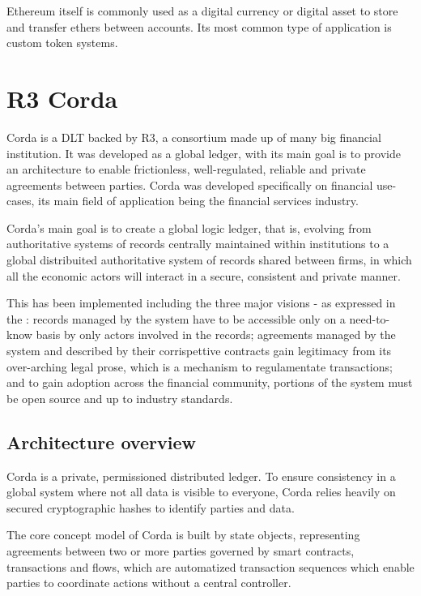 Ethereum itself is commonly used as a digital currency or digital asset to store and transfer ethers between accounts. Its most common type of application is custom token systems. 

\section{R3 Corda}

Corda is a DLT backed by R3, a consortium made up of many big financial institution. It was developed as a global ledger, with its main goal is to provide an architecture to enable frictionless, well-regulated, reliable and private agreements between parties. Corda was developed specifically on financial use-cases, its main field of application being the financial services industry.

Corda's main goal is to create a global logic ledger, that is, evolving from authoritative systems of records centrally maintained within institutions to a global distribuited authoritative system of records shared between firms, in which all the economic actors will interact in a secure, consistent and private manner.

This has been implemented including the three major visions - as expressed in the \cite{cordawhitepaper}: records managed by the system have to be accessible only on a need-to-know basis by only actors involved in the records; agreements managed by the system and described by their corrispettive contracts gain legitimacy from its over-arching legal prose, which is a mechanism to regulamentate transactions; and to gain adoption across the financial community, portions of the system must be open source and up to industry standards.

\subsection{Architecture overview}

Corda is a private, permissioned distributed ledger. To ensure consistency in a global system where not all data is visible to everyone, Corda relies heavily on secured cryptographic hashes to identify parties and data. 

The core concept model of Corda is built by state objects, representing agreements between two or more parties governed by smart contracts, transactions and flows, which are automatized transaction sequences which enable parties to coordinate actions without a central controller.

